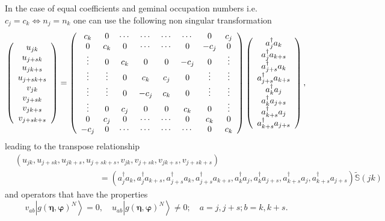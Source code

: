 \documentclass[aps,preprint]{revtex4}%
\begin{document}
In the case of equal coefficients and geminal occupation numbers i.e.
$c_{j}=c_{k}\Leftrightarrow n_{j}=n_{k}$ one can use the following non
singular transformation
\begin{equation}
\left(
\begin{array}
[c]{c}%
u_{jk}\\
u_{j+sk}\\
u_{jk+s}\\
u_{j+sk+s}\\
v_{jk}\\
v_{j+sk}\\
v_{jk+s}\\
v_{j+sk+s}%
\end{array}
\right)  =\left(
\begin{array}
[c]{cccccccc}%
c_{k} & 0 & \cdots & \cdots & \cdots & \cdots & 0 & c_{j}\\
0 & c_{k} & 0 & \cdots & \cdots & 0 & -c_{j} & 0\\
\vdots & 0 & c_{k} & 0 & 0 & -c_{j} & 0 & \vdots\\
\vdots & \vdots & 0 & c_{k} & c_{j} & 0 & \vdots & \vdots\\
\vdots & \vdots & 0 & -c_{j} & c_{k} & 0 & \vdots & \vdots\\
\vdots & 0 & c_{j} & 0 & 0 & c_{k} & 0 & \vdots\\
0 & c_{j} & 0 & \cdots & \cdots & 0 & c_{k} & 0\\
-c_{j} & 0 & \cdots & \cdots & \cdots & \cdots & 0 & c_{k}%
\end{array}
\right)  \left(
\begin{array}
[c]{c}%
a_{j}^{\dagger}a_{k}\\
a_{j}^{\dagger}a_{k+s}\\
a_{j+s}^{\dagger}a_{k}\\
a_{j+s}^{\dagger}a_{k+s}\\
a_{k}^{\dagger}a_{j}\\
a_{k}^{\dagger}a_{j+s}\\
a_{k+s}^{\dagger}a_{j}\\
a_{k+s}^{\dagger}a_{j+s}%
\end{array}
\right)  ,
\end{equation}
leading to the transpose relationship
\begin{align}
&  \left(  u_{jk},u_{j+sk},u_{jk+s},u_{j+sk+s},v_{jk},v_{j+sk},v_{jk+s}%
,v_{j+sk+s}\right) \nonumber\\
&  \qquad\qquad\qquad\qquad\qquad\left.  =\right.  \left(  a_{j}^{\dagger
}a_{k},a_{j}^{\dagger}a_{k+s},a_{j+s}^{\dagger}a_{k},a_{j+s}^{\dagger}%
a_{k+s},a_{k}^{\dagger}a_{j},a_{k}^{\dagger}a_{j+s},a_{k+s}^{\dagger}%
a_{j},a_{k+s}^{\dagger}a_{j+s}\right)  \mathbb{\tilde{S}}\left(  jk\right)
\end{align}
and operators that have the properties
\begin{equation}
v_{ab}\left\vert g\left(  \mathbf{\eta},\mathbf{\varphi}\right)
^{N}\right\rangle =0,\quad u_{ab}\left\vert g\left(  \mathbf{\eta
},\mathbf{\varphi}\right)  ^{N}\right\rangle \neq0;\quad a=j,j+s;b=k,k+s.
\end{equation}
\end{document}

